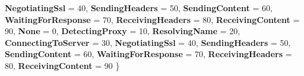 \begin{DoxyCompactItemize}
{\bfseries Negotiating\+Ssl} = 40, 
{\bfseries Sending\+Headers} = 50, 
\newline
{\bfseries Sending\+Content} = 60, 
{\bfseries Waiting\+For\+Response} = 70, 
{\bfseries Receiving\+Headers} = 80, 
{\bfseries Receiving\+Content} = 90, 
\newline
{\bfseries None} = 0, 
{\bfseries Detecting\+Proxy} = 10, 
{\bfseries Resolving\+Name} = 20, 
{\bfseries Connecting\+To\+Server} = 30, 
\newline
{\bfseries Negotiating\+Ssl} = 40, 
{\bfseries Sending\+Headers} = 50, 
{\bfseries Sending\+Content} = 60, 
{\bfseries Waiting\+For\+Response} = 70, 
\newline
{\bfseries Receiving\+Headers} = 80, 
{\bfseries Receiving\+Content} = 90
 \}
\end{DoxyCompactItemize}
